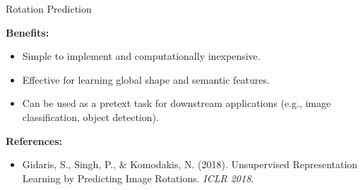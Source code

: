 \begin{frame}[allowframebreaks]{Rotation Prediction}
    \framebreak

    \textbf{Benefits:}
    \begin{itemize}
        \item Simple to implement and computationally inexpensive.
        \item Effective for learning global shape and semantic features.
        \item Can be used as a pretext task for downstream applications (e.g., image classification, object detection).
    \end{itemize}
    \textbf{References:}
    \begin{itemize}
        \item Gidaris, S., Singh, P., & Komodakis, N. (2018). Unsupervised Representation Learning by Predicting Image Rotations. \textit{ICLR 2018}.
    \end{itemize}
\end{frame}